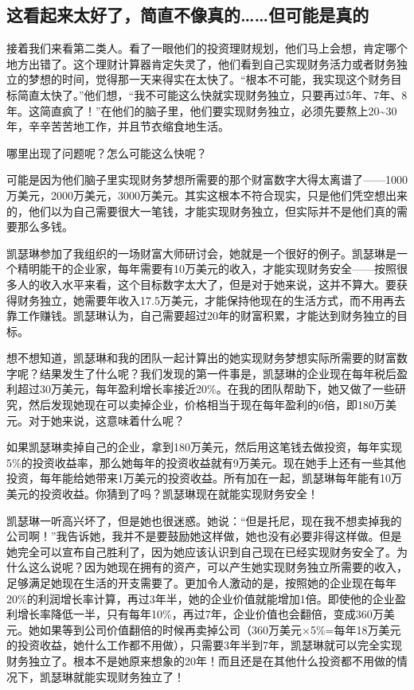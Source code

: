 \subsection{这看起来太好了，简直不像真的……但可能是真的}

接着我们来看第二类人。看了一眼他们的投资理财规划，他们马上会想，肯定哪个地方出错了。这个理财计算器肯定失灵了，他们看到自己实现财务活力或者财务独立的梦想的时间，觉得那一天来得实在太快了。“根本不可能，我实现这个财务目标简直太快了。”他们想，“我不可能这么快就实现财务独立，只要再过5年、7年、8年。这简直疯了！”在他们的脑子里，他们要实现财务独立，必须先要熬上20\textasciitilde{}30年，辛辛苦苦地工作，并且节衣缩食地生活。

哪里出现了问题呢？怎么可能这么快呢？

可能是因为他们脑子里实现财务梦想所需要的那个财富数字大得太离谱了——1000万美元，2000万美元，3000万美元。其实这根本不符合现实，只是他们凭空想出来的，他们以为自己需要很大一笔钱，才能实现财务独立，但实际并不是他们真的需要那么多钱。

凯瑟琳参加了我组织的一场财富大师研讨会，她就是一个很好的例子。凯瑟琳是一个精明能干的企业家，每年需要有10万美元的收入，才能实现财务安全——按照很多人的收入水平来看，这个目标数字太大了，但是对于她来说，这并不算大。要获得财务独立，她需要年收入17.5万美元，才能保持他现在的生活方式，而不用再去靠工作赚钱。凯瑟琳认为，自己需要超过20年的财富积累，才能达到财务独立的目标。

想不想知道，凯瑟琳和我的团队一起计算出的她实现财务梦想实际所需要的财富数字呢？结果发生了什么呢？我们发现的第一件事是，凯瑟琳的企业现在每年税后盈利超过30万美元，每年盈利增长率接近20\%。在我的团队帮助下，她又做了一些研究，然后发现她现在可以卖掉企业，价格相当于现在每年盈利的6倍，即180万美元。对于她来说，这意味着什么呢？

如果凯瑟琳卖掉自己的企业，拿到180万美元，然后用这笔钱去做投资，每年实现5\%的投资收益率，那么她每年的投资收益就有9万美元。现在她手上还有一些其他投资，每年能给她带来1万美元的投资收益。所有加在一起，凯瑟琳每年能有10万美元的投资收益。你猜到了吗？凯瑟琳现在就能实现财务安全！

凯瑟琳一听高兴坏了，但是她也很迷惑。她说：“但是托尼，现在我不想卖掉我的公司啊！”我告诉她，我并不是要鼓励她这样做，她也没有必要非得这样做。但是她完全可以宣布自己胜利了，因为她应该认识到自己现在已经实现财务安全了。为什么这么说呢？因为她现在拥有的资产，可以产生她实现财务独立所需要的收入，足够满足她现在生活的开支需要了。更加令人激动的是，按照她的企业现在每年20\%的利润增长率计算，再过3年半，她的企业价值就能增加1倍。即使他的企业盈利增长率降低一半，只有每年10\%，再过7年，企业价值也会翻倍，变成360万美元。她如果等到公司价值翻倍的时候再卖掉公司（360万美元×5\%=每年18万美元的投资收益，她什么工作都不用做），只需要3年半到7年，凯瑟琳就可以完全实现财务独立了。根本不是她原来想象的20年！而且还是在其他什么投资都不用做的情况下，凯瑟琳就能实现财务独立了！

